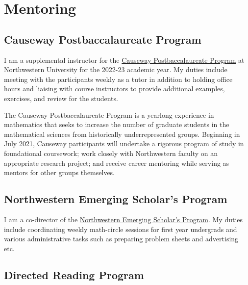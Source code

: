 \documentclass[
]{report}
\begin{document}
\hypertarget{mentoring}{%
\chapter{Mentoring}\label{mentoring}}

\hypertarget{causeway-postbaccalaureate-program}{%
\section{Causeway Postbaccalaureate Program}\label{causeway-postbaccalaureate-program}}

I am a supplemental instructor for the \href{https://sites.northwestern.edu/causeway/}{Causeway Postbaccalaureate Program}
at Northwestern University for the 2022-23 academic year.
My duties include meeting with the participants weekly as a tutor in addition to holding office hours and liaising with course instructors to provide additional examples, exercises, and review for the students.

The Causeway Postbaccalaureate Program is a yearlong experience in mathematics that seeks to increase the number of graduate students in the mathematical sciences from historically underrepresented groups. Beginning in July 2021, Causeway participants will undertake a rigorous program of study in foundational coursework; work closely with Northwestern faculty on an appropriate research project; and receive career mentoring while serving as mentors for other groups themselves.

\hypertarget{northwestern-emerging-scholars-program}{%
\section{Northwestern Emerging Scholar's Program}\label{northwestern-emerging-scholars-program}}

I am a co-director of the \href{https://www.math.northwestern.edu/undergraduate/prizes-competitions-organizations/northwestern-emerging-scholars.html}{Northwestern Emerging Scholar's
Program}.
My duties include coordinating weekly math-circle sessions for first year undergrads and various administrative tasks such as preparing problem sheets and advertising etc.

\hypertarget{directed-reading-program}{%
\section{Directed Reading Program}\label{directed-reading-program}}
\end{document}
